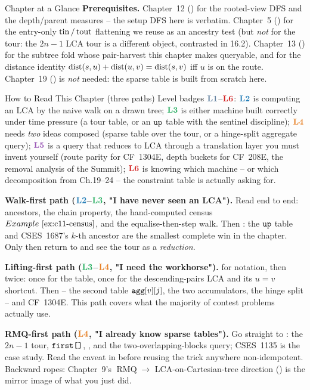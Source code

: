 \begin{chaptertheorybox}{Chapter at a Glance}
\textbf{Prerequisites.} Chapter~12 () for the rooted-view DFS
and the depth/parent measures -- the setup DFS here is 
verbatim.  Chapter~5 () for the entry-only \(\operatorname{tin}/\operatorname{tout}\)
flattening we reuse as an ancestry test (but \emph{not} for the tour: the
\(2n-1\) LCA tour is a different object, contrasted in 16.2).  Chapter~13
() for the subtree fold whose pair-harvest this chapter makes
queryable, and for the distance identity \(\operatorname{dist}(s,u)+\operatorname{dist}(u,v)=\operatorname{dist}(s,v)\)
iff \(u\) is on the route.  Chapter~19 () is \emph{not} needed:
the sparse table is built from scratch here.
\end{chaptertheorybox}

\begin{chaptertheorybox}{How to Read This Chapter (three paths)}
Level badges \(\lv1\)--\(\lv6\): \(\lv2\) is computing an LCA by the naive
walk on a drawn tree; \(\lv3\) is either machine built correctly under time
pressure (a tour table, or an \(\texttt{up}\) table with the sentinel
discipline); \(\lv4\) needs \emph{two} ideas composed (sparse table over
the tour, or a hinge-split aggregate query); \(\lv5\) is a query that
reduces to LCA through a translation layer you must invent yourself (route
parity for CF~1304E, depth buckets for CF~208E, the removal analysis of
the Summit); \(\lv6\) is knowing which machine -- or which decomposition
from Ch.19--24 -- the constraint table is actually asking for.

\textbf{Walk-first path (\(\lv2\)--\(\lv3\), "I have never seen an LCA").}
Read  end to end: ancestors, the chain property, the
hand-computed census \(\exref{c11-census}\), and the equalise-then-step
walk.  Then : the \(\texttt{up}\) table and CSES~1687's
\(k\)-th ancestor are the smallest complete win in the chapter.  Only then
return to  and see the tour as a \emph{reduction}.

\textbf{Lifting-first path (\(\lv3\)--\(\lv4\), "I need the workhorse").}
 for notation, then  twice: once for
the table, once for the descending-pairs LCA and its \(u=v\) shortcut.
Then  -- the second table \(\texttt{agg}[v][j]\), the
two accumulators, the hinge split -- and CF~1304E.  This path covers what
the majority of contest problems actually use.

\textbf{RMQ-first path (\(\lv4\), "I already know sparse tables").}
Go straight to : the \(2n-1\) tour, \(\texttt{first[]}\),
, and the two-overlapping-blocks query; CSES~1135 is
the case study.  Read the caveat in  before reusing
the trick anywhere non-idempotent.  Backward ropes: Chapter~9's
\(\operatorname{RMQ}\to\) LCA-on-Cartesian-tree direction () is the mirror
image of what you just did.
\end{chaptertheorybox}

